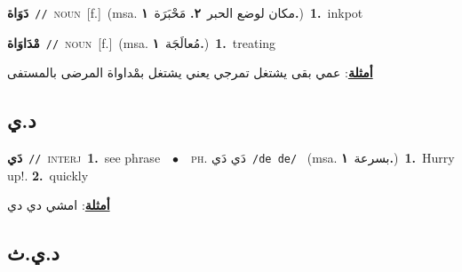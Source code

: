 \documentclass[10pt,a4paper,twoside]{article} %
\begin{document}
\begin{multicols}{2}
{\setlength\topsep{0pt}\textbf{\foreignlanguage{arabic}{دَوَاة}}\ {\color{gray}\texttt{//}\color{black}}\ \textsc{noun}\ [f.]\ \color{gray}(msa. \foreignlanguage{arabic}{مكان لوضع الحبر}~\foreignlanguage{arabic}{\textbf{٢.}}  \foreignlanguage{arabic}{مَحْبَرَة}~\foreignlanguage{arabic}{\textbf{١.}})\color{black}\ \textbf{1.}~inkpot\ } \vspace{2mm}

{\setlength\topsep{0pt}\textbf{\foreignlanguage{arabic}{مْدَاوَاة}}\ {\color{gray}\texttt{//}\color{black}}\ \textsc{noun}\ [f.]\ \color{gray}(msa. \foreignlanguage{arabic}{مُعالَجَة}~\foreignlanguage{arabic}{\textbf{١.}})\color{black}\ \textbf{1.}~treating\  \begin{flushright}\color{gray}\foreignlanguage{arabic}{\textbf{\underline{\foreignlanguage{arabic}{أمثلة}}}: عمي بقى يشتغل تمرجي يعني يشتغل بمْداواة المرضى بالمستفى}\end{flushright}\color{black}} \vspace{2mm}

\vspace{-3mm}
\subsection*{\color{blue}\foreignlanguage{arabic}{د.ي}\color{blue}{ (ntws)}} 

{\setlength\topsep{0pt}\textbf{\foreignlanguage{arabic}{دَي}}\ {\color{gray}\texttt{//}\color{black}}\ \textsc{interj}\ \textbf{1.}~see phrase\ \ $\bullet$\ \ \textsc{ph.} \color{gray} \foreignlanguage{arabic}{دَي دَي}\color{black}\ {\color{gray}\texttt{/{\sffamily de de}/}\color{black}}\ \color{gray} (msa. \foreignlanguage{arabic}{بسرعة}~\foreignlanguage{arabic}{\textbf{١.}})\color{black}\ \textbf{1.}~Hurry up!.  \textbf{2.}~quickly\  \begin{flushright}\color{gray}\foreignlanguage{arabic}{\textbf{\underline{\foreignlanguage{arabic}{أمثلة}}}: امشي دي دي}\end{flushright}\color{black}} \vspace{2mm}

\vspace{-3mm}
\subsection*{\color{blue}\foreignlanguage{arabic}{د.ي.ث}\color{blue}{}} 


\end{multicols}
\end{document}
